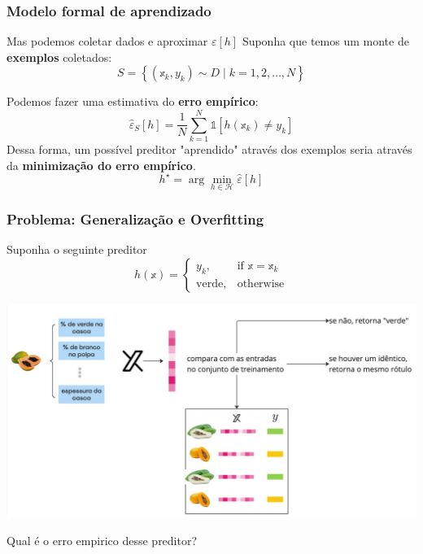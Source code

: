 \begin{frame}
    \frametitle{Modelo formal de aprendizado}
    \begin{block}{Mas podemos coletar dados e aproximar $\varepsilon[h]$}
        Suponha que temos um monte de \textbf{exemplos} coletados:
        $$
            S = \left\{(\mathbb{x}_k, y_k)\sim D  \mid k =1, 2, \ldots, N\right\}
        $$
        
        Podemos fazer uma estimativa do \textbf{erro empírico}: 
        $$
            \hat\varepsilon_S[h] = \frac{1}{N}\sum_{k=1}^N \mathbb{1}\left[h(\mathbb{x}_k)\neq y_k\right]
        $$
        Dessa forma, um possível preditor "aprendido" através dos exemplos seria através da \textbf{minimização do erro empírico}.
        $$
            h^{\star} = \arg\min_{h \in \mathcal{H}}\hat\varepsilon[h]
        $$

    \end{block}
\end{frame}

\begin{frame}
    \frametitle{Problema: Generalização e Overfitting}
    \begin{block}{Suponha o seguinte preditor}
        $$
        h(\mathbb{x}) = \begin{cases}
            y_k,              & \text{if } \mathbb{x} = \mathbb{x}_k\\
            \mathrm{verde},   & \text{otherwise}
        \end{cases}
        $$
    \begin{center}
        \includegraphics[width=0.65\paperwidth]{./imgs/fig9-preditor-trivial.jpg}
    \end{center}\vspace{-4mm}
    Qual é o erro empirico desse preditor?
    \end{block}
\end{frame}


